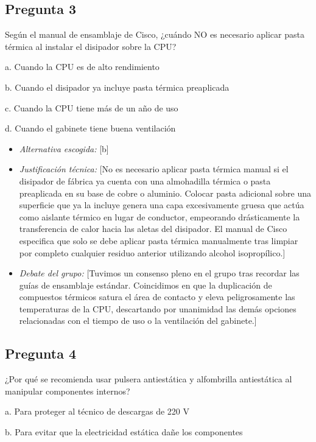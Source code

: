 \documentclass{article}
\begin{document}
\subsection{Pregunta 3}
\label{sec:orgfa9761c}
Según el manual de ensamblaje de Cisco, ¿cuándo NO es necesario aplicar pasta térmica al instalar el disipador sobre la CPU?

a. Cuando la CPU es de alto rendimiento

b. Cuando el disipador ya incluye pasta térmica preaplicada

c. Cuando la CPU tiene más de un año de uso

d. Cuando el gabinete tiene buena ventilación

\begin{itemize}
\item \emph{Alternativa escogida:} [b]

\item \emph{Justificación técnica:} [No es necesario aplicar pasta térmica
manual si el disipador de fábrica ya cuenta con una
almohadilla térmica o pasta preaplicada en su base de cobre o
aluminio. Colocar pasta adicional sobre una superficie que ya la
incluye genera una capa excesivamente gruesa que actúa como aislante
térmico en lugar de conductor, empeorando drásticamente la
transferencia de calor hacia las aletas del disipador. El manual de
Cisco especifica que solo se debe aplicar pasta térmica manualmente
tras limpiar por completo cualquier residuo anterior utilizando
alcohol isopropílico.]

\item \emph{Debate del grupo:} [Tuvimos un consenso pleno en el grupo tras
recordar las guías de ensamblaje estándar. Coincidimos en que la
duplicación de compuestos térmicos satura el área de contacto y
eleva peligrosamente las temperaturas de la CPU, descartando por
unanimidad las demás opciones relacionadas con el tiempo de uso o la
ventilación del gabinete.]
\end{itemize}

\subsection{Pregunta 4}
\label{sec:org95a382b}
¿Por qué se recomienda usar pulsera antiestática y alfombrilla antiestática al manipular componentes internos?

a. Para proteger al técnico de descargas de 220 V

b. Para evitar que la electricidad estática dañe los componentes
\end{document}
